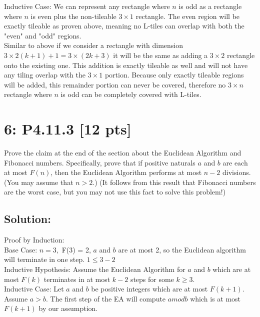 \documentclass[12pt]{article}
\begin{document}
Inductive Case: We can represent any rectangle where $n$ is odd as a rectangle where $n$ is even plus the non-tileable $3 \times 1$ rectangle. The even region will be exactly tileable as proven above, meaning no L-tiles can overlap with both the "even" and "odd" regions. \\

Similar to above if we consider a rectangle with dimension $3 \times 2(k+1) + 1 = 3 \times (2k+3)$ it will be the same as adding a $3 \times 2$ rectangle onto the existing one. This addition is exactly tileable as well and will not have any tiling overlap with the $3 \times 1$ portion. Because only exactly tileable regions will be added, this remainder portion can never be covered, therefore no $3 \times n$ rectangle where $n$ is odd can be completely covered with L-tiles. \\




\newpage
\section*{\textbf{6: P4.11.3} [12 pts]}
Prove the claim at the end of the section about the Euclidean Algorithm and Fibonacci numbers. Specifically, prove that if positive naturals $a$ and $b$ are each at most $F(n)$, then the Euclidean Algorithm performs at most $n - 2$ divisions. (You may assume that $n > 2$.) (It follows from this result that Fibonacci numbers are the worst case, but you may not use this fact to solve this problem!)



\subsection*{\textbf{Solution:}}
Proof by Induction:\\

Base Case: $n=3, $ F(3) = 2, $a$ and $b$ are at most 2, so the Euclidean algorithm will terminate in one step. $1 \leq 3-2$\\

Inductive Hypothesis: Assume the Euclidean Algorithm for $a$ and $b$ which are at most $F(k)$ terminates in at most $k-2$ steps for some $k \geq 3$.\\

Inductive Case: Let $a$ and $b$ be positive integers which are at most $F(k+1)$. Assume $a > b$. The first step of the EA will compute $a mod b$ which is at most $F(k+1)$ by our assumption. \\
\end{document}
